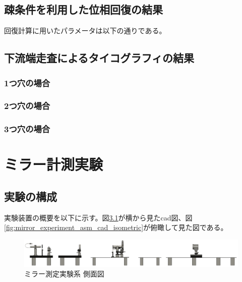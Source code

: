 \documentclass[dvipdfmx,autodetect-engine]{jreport}
\begin{document}
\section{疎条件を利用した位相回復の結果}
回復計算に用いたパラメータは以下の通りである。


\section{下流端走査によるタイコグラフィの結果}
\subsection{1つ穴の場合}

\subsection{2つ穴の場合}

\subsection{3つ穴の場合}


\newpage
\chapter{ミラー計測実験}
\minitoc

\newpage
\section{実験の構成}
実験装置の概要を以下に示す。図\ref{fig:mirror_experiment_asm_cad_side}が横から見たcad図、図\ref{fig:mirror_experiment_asm_cad_isometric}が俯瞰して見た図である。

\begin{figure}[h!]
\centering
\includegraphics[scale=0.25]{images/mirror_experiment/setup/asm_total_side.png}
\caption{ミラー測定実験系 側面図}
\label{fig:mirror_experiment_asm_cad_side}
\end{figure}
\end{document}
